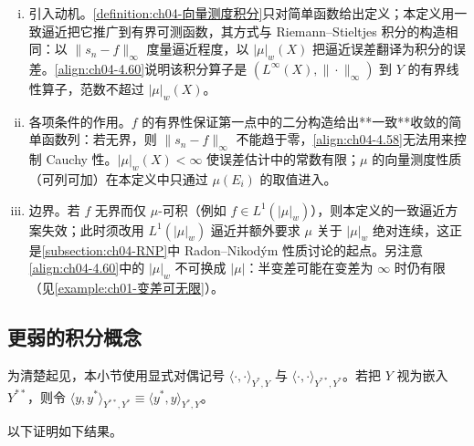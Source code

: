 \documentclass[../../main.tex]{subfiles}%
\begin{document}
\begin{remark}\label{remark:ch04-有界函数向量测度积分动机}
\begin{enumerate}[(i)]
\item 引入动机。\cref{definition:ch04-向量测度积分}只对简单函数给出定义；本定义用一致逼近把它推广到有界可测函数，其方式与 Riemann--Stieltjes 积分的构造相同：以 $\|s_n-f\|_\infty$ 度量逼近程度，以 $|\mu|_w(X)$ 把逼近误差翻译为积分的误差。\eqref{align:ch04-4.60}说明该积分算子是 $(L^\infty(X),\|\cdot\|_\infty)$ 到 $Y$ 的有界线性算子，范数不超过 $|\mu|_w(X)$。

\item 各项条件的作用。$f$ 的有界性保证第一点中的二分构造给出**一致**收敛的简单函数列：若无界，则 $\|s_n-f\|_\infty$ 不能趋于零，\eqref{align:ch04-4.58}无法用来控制 Cauchy 性。$|\mu|_w(X)<\infty$ 使误差估计中的常数有限；$\mu$ 的向量测度性质（可列可加）在本定义中只通过 $\mu(E_i)$ 的取值进入。

\item 边界。若 $f$ 无界而仅 $\mu$-可积（例如 $f\in L^1(|\mu|_w)$），则本定义的一致逼近方案失效；此时须改用 $L^1(|\mu|_w)$ 逼近并额外要求 $\mu$ 关于 $|\mu|_w$ 绝对连续，这正是\cref{subsection:ch04-RNP}中 Radon--Nikodým 性质讨论的起点。另注意\eqref{align:ch04-4.60}中的 $|\mu|_w$ 不可换成 $|\mu|$：半变差可能在变差为 $\infty$ 时仍有限（见\cref{example:ch01-变差可无限}）。
\end{enumerate}
\end{remark}

\subsection{更弱的积分概念}\label{subsection:ch04-弱积分}

为清楚起见，本小节使用显式对偶记号 $\langle\cdot,\cdot\rangle_{Y^*,Y}$ 与 $\langle\cdot,\cdot\rangle_{Y^{**},Y^*}$。若把 $Y$ 视为嵌入 $Y^{**}$，则令 $\langle y,y^*\rangle_{Y^{**},Y^*}\equiv\langle y^*,y\rangle_{Y^*,Y}$。

以下证明如下结果。
\end{document}
